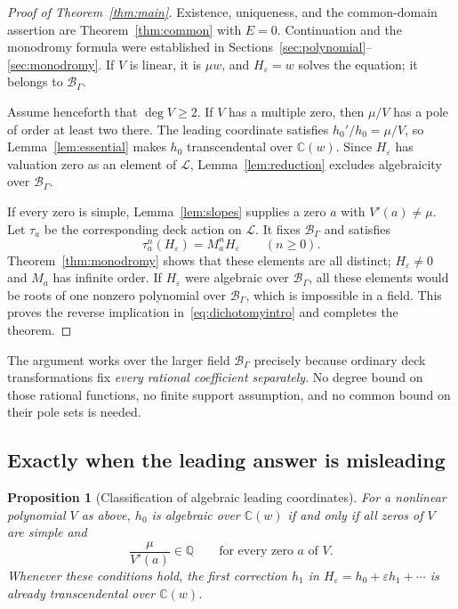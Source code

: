 \documentclass[11pt,a4paper]{article}
\numberwithin{equation}{section}
\newtheorem{proposition}[theorem]{Proposition}
\theoremstyle{definition}
\theoremstyle{remark}
\newcommand{\C}{\mathbb C}
\newcommand{\Q}{\mathbb Q}
\newcommand{\B}{\mathscr B_\Gamma}
\newcommand{\eps}{\varepsilon}
\begin{document}
\begin{proof}[Proof of Theorem~\ref{thm:main}]
Existence, uniqueness, and the common-domain assertion are
Theorem~\ref{thm:common} with $E=0$.  Continuation and the monodromy formula
were established in Sections~\ref{sec:polynomial}--\ref{sec:monodromy}.
If $V$ is linear, it is $\mu w$, and $H_\eps=w$ solves the equation; it
belongs to $\B$.

Assume henceforth that $\deg V\ge2$.  If $V$ has a multiple zero, then
$\mu/V$ has a pole of order at least two there.  The leading coordinate
satisfies $h_0'/h_0=\mu/V$, so Lemma~\ref{lem:essential} makes $h_0$
transcendental over $\C(w)$.  Since $H_\eps$ has valuation zero as an
element of $\mathscr L$, Lemma~\ref{lem:reduction} excludes algebraicity
over $\B$.

If every zero is simple, Lemma~\ref{lem:slopes} supplies a zero $a$ with
$V'(a)\ne\mu$.  Let $\tau_a$ be the corresponding deck action on
$\mathscr L$.  It fixes $\B$ and satisfies
\[
 \tau_a^n(H_\eps)=M_a^n H_\eps\qquad(n\ge0).
\]
Theorem~\ref{thm:monodromy} shows that these elements are all distinct;
$H_\eps\ne0$ and $M_a$ has infinite order.  If $H_\eps$ were algebraic over
$\B$, all these elements would be roots of one nonzero polynomial over
$\B$, which is impossible in a field.  This proves the reverse implication
in~\eqref{eq:dichotomyintro} and completes the theorem.
\end{proof}

The argument works over the larger field $\B$ precisely because ordinary
deck transformations fix \emph{every rational coefficient separately}.
No degree bound on those rational functions, no finite support assumption,
and no common bound on their pole sets is needed.

\subsection{Exactly when the leading answer is misleading}

\begin{proposition}[Classification of algebraic leading coordinates]
\label{prop:leadingalgebraic}
For a nonlinear polynomial $V$ as above, $h_0$ is algebraic over $\C(w)$
if and only if all zeros of $V$ are simple and
\begin{equation}\label{eq:rationalresidues}
 \frac\mu{V'(a)}\in\Q\qquad\text{for every zero }a\text{ of }V.
\end{equation}
Whenever these conditions hold, the first correction $h_1$ in
$H_\eps=h_0+\eps h_1+\cdots$ is already transcendental over $\C(w)$.
\end{proposition}
\end{document}
